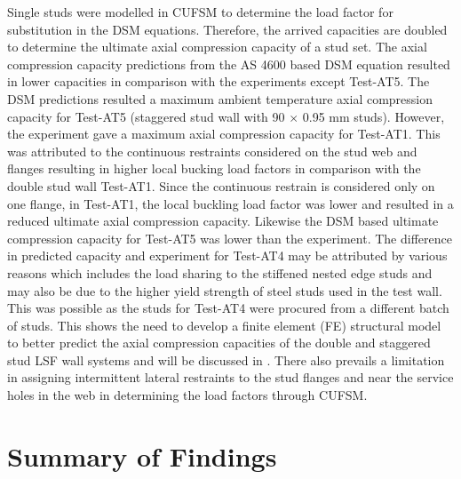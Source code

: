 Single studs were modelled in CUFSM to determine the load factor for substitution in the DSM equations. Therefore, the arrived capacities are doubled to determine the ultimate axial compression capacity of a stud set. The axial compression capacity predictions from the AS 4600 based DSM equation resulted in lower capacities in comparison with the experiments except Test-AT5. The DSM predictions resulted a maximum ambient temperature axial compression capacity for Test-AT5 (staggered stud wall with 90 $\times$ 0.95 mm studs). However, the experiment gave a maximum axial compression capacity for Test-AT1. This was attributed to the continuous restraints considered on the stud web and flanges resulting in higher local bucking load factors in comparison with the double stud wall Test-AT1. Since the continuous restrain is considered only on one flange, in Test-AT1, the local buckling load factor was lower and resulted in a reduced ultimate axial compression capacity. Likewise the DSM based ultimate compression capacity for Test-AT5 was lower than the experiment. The difference in predicted capacity and experiment for Test-AT4 may be attributed by various reasons which includes the load sharing to the stiffened nested edge studs and may also be due to the higher yield strength of steel studs used in the test wall. This was possible as the studs for Test-AT4 were procured from a different batch of studs. This shows the need to develop a finite element (FE) structural model to better predict the axial compression capacities of the double and staggered stud LSF wall systems and will be discussed in . There also prevails a limitation in assigning intermittent lateral restraints to the stud flanges and near the service holes in the web in determining the load factors through CUFSM.

\section{Summary of Findings}

